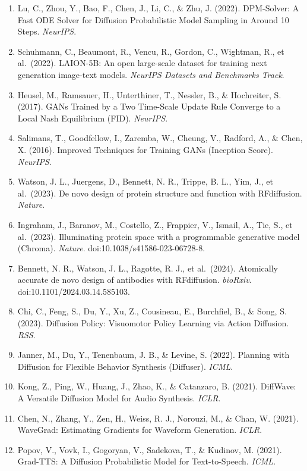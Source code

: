 \begin{enumerate}
  Karras, T., Aittala, M., Aila, T., \& Laine, S. (2022). Elucidating the Design Space of Diffusion-Based Generative Models (EDM). \emph{NeurIPS}.
\item
  Lu, C., Zhou, Y., Bao, F., Chen, J., Li, C., \& Zhu, J. (2022). DPM-Solver: A Fast ODE Solver for Diffusion Probabilistic Model Sampling in Around 10 Steps. \emph{NeurIPS}.
\item
  Schuhmann, C., Beaumont, R., Vencu, R., Gordon, C., Wightman, R., et al.~(2022). LAION-5B: An open large-scale dataset for training next generation image-text models. \emph{NeurIPS Datasets and Benchmarks Track}.
\item
  Heusel, M., Ramsauer, H., Unterthiner, T., Nessler, B., \& Hochreiter, S. (2017). GANs Trained by a Two Time-Scale Update Rule Converge to a Local Nash Equilibrium (FID). \emph{NeurIPS}.
\item
  Salimans, T., Goodfellow, I., Zaremba, W., Cheung, V., Radford, A., \& Chen, X. (2016). Improved Techniques for Training GANs (Inception Score). \emph{NeurIPS}.
\item
  Watson, J. L., Juergens, D., Bennett, N. R., Trippe, B. L., Yim, J., et al.~(2023). De novo design of protein structure and function with RFdiffusion. \emph{Nature}.
\item
  Ingraham, J., Baranov, M., Costello, Z., Frappier, V., Ismail, A., Tie, S., et al.~(2023). Illuminating protein space with a programmable generative model (Chroma). \emph{Nature}. doi:10.1038/s41586-023-06728-8.
\item
  Bennett, N. R., Watson, J. L., Ragotte, R. J., et al.~(2024). Atomically accurate de novo design of antibodies with RFdiffusion. \emph{bioRxiv}. doi:10.1101/2024.03.14.585103.
\item
  Chi, C., Feng, S., Du, Y., Xu, Z., Cousineau, E., Burchfiel, B., \& Song, S. (2023). Diffusion Policy: Visuomotor Policy Learning via Action Diffusion. \emph{RSS}.
\item
  Janner, M., Du, Y., Tenenbaum, J. B., \& Levine, S. (2022). Planning with Diffusion for Flexible Behavior Synthesis (Diffuser). \emph{ICML}.
\item
  Kong, Z., Ping, W., Huang, J., Zhao, K., \& Catanzaro, B. (2021). DiffWave: A Versatile Diffusion Model for Audio Synthesis. \emph{ICLR}.
\item
  Chen, N., Zhang, Y., Zen, H., Weiss, R. J., Norouzi, M., \& Chan, W. (2021). WaveGrad: Estimating Gradients for Waveform Generation. \emph{ICLR}.
\item
  Popov, V., Vovk, I., Gogoryan, V., Sadekova, T., \& Kudinov, M. (2021). Grad-TTS: A Diffusion Probabilistic Model for Text-to-Speech. \emph{ICML}.

\end{enumerate}
